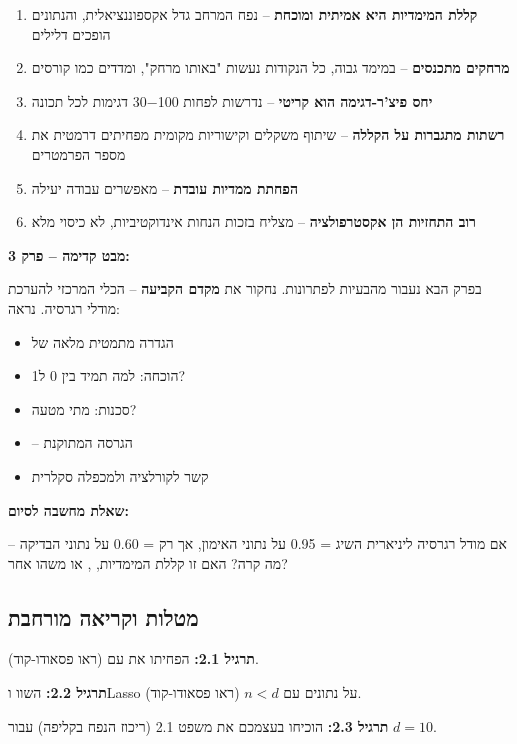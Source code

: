 \begin{enumerate}
\item \textbf{קללת המימדיות היא אמיתית ומוכחת} – נפח המרחב גדל אקספוננציאלית, והנתונים הופכים דלילים
\item \textbf{מרחקים מתכנסים} – במימד גבוה, כל הנקודות נעשות "באותו מרחק", ומדדים כמו  קורסים
\item \textbf{יחס פיצ'ר-דגימה הוא קריטי} – נדרשות לפחות \num{30-100} דגימות לכל תכונה
\item \textbf{רשתות  מתגברות על הקללה} – שיתוף משקלים וקישוריות מקומית מפחיתים דרמטית את מספר הפרמטרים
\item \textbf{הפחתת ממדיות עובדת} –  מאפשרים עבודה יעילה
\item \textbf{רוב התחזיות הן אקסטרפולציה} –  מצליח בזכות הנחות אינדוקטיביות, לא כיסוי מלא
\end{enumerate}

\textbf{מבט קדימה – פרק \num{3}:}

בפרק הבא נעבור מהבעיות לפתרונות. נחקור את \textbf{מקדם הקביעה \Rsquared{}} – הכלי המרכזי להערכת מודלי רגרסיה. נראה:

\begin{itemize}
\item הגדרה מתמטית מלאה של \Rsquared{}
\item הוכחה: למה \Rsquared{} תמיד בין \num{0} ל\en{-}\num{1}?
\item סכנות: מתי \Rsquared{} מטעה?
\item {} – הגרסה המתוקנת
\item קשר לקורלציה ולמכפלה סקלרית
\end{itemize}

\textbf{שאלת מחשבה לסיום:}

אם מודל רגרסיה ליניארית השיג \Rsquared{} = \num{0.95} על נתוני האימון, אך רק \Rsquared{} = \num{0.60} על נתוני הבדיקה – מה קרה? האם זו קללת המימדיות, , או משהו אחר?

\subsection*{מטלות וקריאה מורחבת}

\textbf{תרגיל \num{2.1}:} הפחיתו את  עם  (ראו פסאודו-קוד).

\textbf{תרגיל \num{2.2}:} השוו  ו\en{-}Lasso על נתונים עם $n < d$ (ראו פסאודו-קוד).

\textbf{תרגיל \num{2.3}:} הוכיחו בעצמכם את משפט \num{2.1} (ריכוז הנפח בקליפה) עבור $d = \num{10}$.

